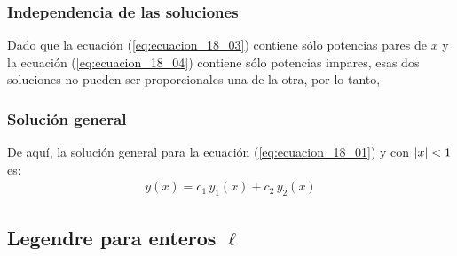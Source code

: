 \documentclass[12pt]{beamer}
\begin{document}
\begin{frame}
\frametitle{Independencia de las soluciones}
Dado que la ecuación (\ref{eq:ecuacion_18_03}) contiene sólo potencias pares de $x$ y la ecuación (\ref{eq:ecuacion_18_04}) contiene sólo potencias impares, \pause esas dos soluciones no pueden ser proporcionales una de la otra, \pause por lo tanto, 
\end{frame}
\begin{frame}
\frametitle{Solución general}
De aquí, la solución general para la ecuación (\ref{eq:ecuacion_18_01}) y con $\abs{x} < 1$ es:
\pause
\begin{align*}
y (x) = c_{1} \, y_{1} (x) + c_{2} \, y_{2} (x)
\end{align*}
\end{frame}

\subsection{Legendre para enteros \texorpdfstring{$\ell$}{l}}
\end{document}
